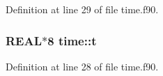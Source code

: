 Definition at line 29 of file time.f90.

\hypertarget{namespacetime_aa46f2c3f534f88596e49840033d82a8a}{
\subsubsection[{t}]{\setlength{\rightskip}{0pt plus 5cm}REAL$\ast$8 {\bf time::t}}}
\label{namespacetime_aa46f2c3f534f88596e49840033d82a8a}


Definition at line 28 of file time.f90.

